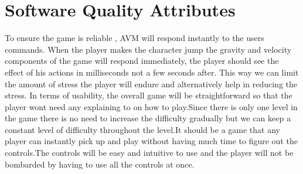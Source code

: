 \section{Software Quality Attributes}
To ensure the game is reliable , AVM will respond instantly to the users commands. When the player makes the character jump the gravity and velocity components of the game will respond immediately, the player should see the effect of his actions in milliseconds not a few seconds after. This way we can limit the amount of stress the player will endure and alternatively help in reducing the stress.
In terms of usability, the overall game will be straightforward so that the player wont need any explaining to on how to play.Since there is only one level in the game there is no need to increase the difficulty gradually but we can keep a constant level of difficulty throughout the level.It should be a game that any player can instantly pick up and play without having much time to figure out the controls.The controls will be easy and intuitive to use and the player will not be bombarded by having to use all the controls at once.


